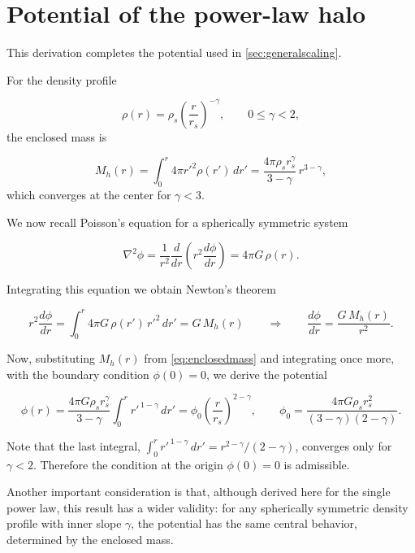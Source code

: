 \section{Potential of the power-law halo}
\label{app:powerlawpot}

This derivation completes the potential used in \cref{sec:generalscaling}.

For the density profile

\begin{equation}
    \rho(r) = \rho_s \left( \frac{r}{r_s} \right)^{-\gamma},
    \qquad 0 \le \gamma < 2,
\end{equation}
the enclosed mass is

\begin{equation} \label{eq:enclosedmass}
M_h(r) = \int_0^r 4\pi r'^2 \rho(r')\, dr'
= \frac{4\pi \rho_s r_s^{\gamma}}{3-\gamma}\, r^{3-\gamma},
\end{equation}
which converges at the center for $\gamma < 3$.

We now recall Poisson's equation for a spherically symmetric system

\begin{equation}
\nabla^2 \phi = \frac{1}{r^2}\frac{d}{dr}\!\left( r^2 \frac{d\phi}{dr} \right) 
= 4\pi G\, \rho(r).
\end{equation}

Integrating this equation we obtain Newton's theorem

\begin{equation}
r^2 \frac{d\phi}{dr} = \int_0^r 4\pi G\, \rho(r')\, r'^2\, dr' = G\, M_h(r)
\qquad\Longrightarrow\qquad
\frac{d\phi}{dr} = \frac{G\, M_h(r)}{r^2}.
\end{equation}

Now, substituting $M_h(r)$ from \cref{eq:enclosedmass} and integrating once more, 
with the boundary condition $\phi(0)=0$, we derive the potential


\begin{equation} \label{eq:app_potential}
\phi(r) = \frac{4\pi G \rho_s r_s^{\gamma}}{3-\gamma}\int_0^r r'^{\,1-\gamma}\, dr'
= \phi_0 \left( \frac{r}{r_s} \right)^{2-\gamma},
\qquad
\phi_0 = \frac{4\pi G \rho_s r_s^{2}}{(3-\gamma)(2-\gamma)} .
\end{equation}

Note that the last integral, $\int_0^r r'^{\,1-\gamma}\, dr' = r^{2-\gamma}/(2-\gamma)$, converges only for 
$\gamma < 2$. Therefore the condition at the origin $\phi(0)=0$ is admissible.

Another important consideration is that, although derived here for the single power law,
this result has a wider validity: for any spherically symmetric density profile with inner slope $\gamma$,
the potential has the same central behavior, determined by the enclosed mass.




